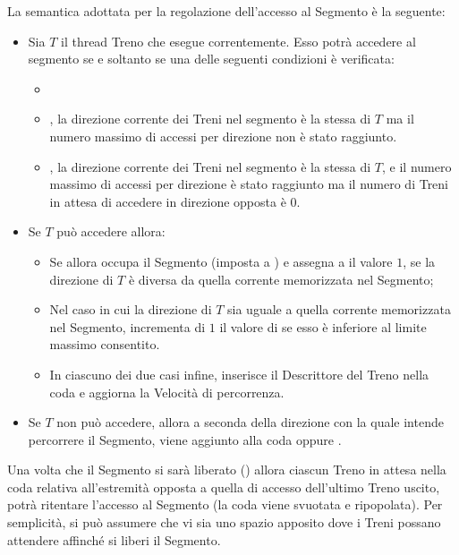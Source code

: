 \begin{description}
		La semantica adottata per la regolazione dell'accesso al Segmento è la seguente:
		\begin{itemize}
			\item Sia $T$ il thread Treno che esegue correntemente. Esso potrà accedere al segmento se e soltanto se una delle seguenti condizioni è verificata:
				\begin{itemize}
					\item {}
					\item {}, la direzione corrente dei Treni nel segmento è la stessa di $T$ ma il numero massimo di accessi per direzione non è stato raggiunto.
					\item {}, la direzione corrente dei Treni nel segmento è la stessa di $T$, e il numero massimo di accessi per direzione è stato raggiunto ma il numero di Treni in attesa di accedere in direzione opposta è 0.
				\end{itemize}
			\item Se $T$ può accedere allora:
				\begin{itemize}
					\item Se  allora occupa il Segmento (imposta  a ) e assegna a  il valore $1$, se la direzione di $T$ è diversa da quella corrente memorizzata nel Segmento;
					\item Nel caso in cui la direzione di $T$ sia uguale a quella corrente memorizzata nel Segmento, incrementa di $1$ il valore di  se esso è inferiore al limite massimo consentito.
					\item In ciascuno dei due casi infine, inserisce il Descrittore del Treno nella coda  e aggiorna la Velocità di percorrenza.
				\end{itemize}
			\item Se $T$ non può accedere, allora a seconda della direzione con la quale intende percorrere il Segmento, viene aggiunto alla coda  oppure .
		\end{itemize}
			
			Una volta che il Segmento si sarà liberato () allora ciascun Treno in attesa nella coda relativa all'estremità opposta a quella di accesso dell'ultimo Treno uscito, potrà ritentare l'accesso al Segmento (la coda viene svuotata e ripopolata).
			Per semplicità, si può assumere che vi sia uno spazio apposito dove i Treni possano attendere affinché si liberi il Segmento.
			  

\end{description}

